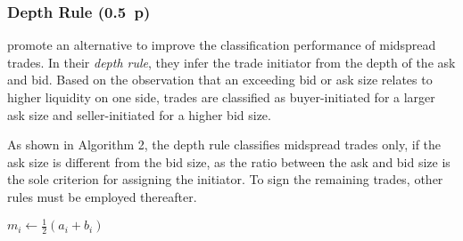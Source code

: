 
\subsubsection{Depth Rule (0.5~p)}\label{depth-rule}

\textcite{grauerOptionTradeClassification2022} promote an alternative to improve the classification performance of midspread trades. In their \textit{depth rule}, they infer the trade initiator from the depth of the ask and bid. Based on the observation that an exceeding bid or ask size relates to higher liquidity on one side, trades are classified as buyer-initiated for a larger ask size and seller-initiated for a higher bid size.

As shown in Algorithm 2, the depth rule classifies midspread trades only, if the ask size is different from the bid size, as the ratio between the ask and bid size is the sole criterion for assigning the initiator. To sign the remaining trades, other rules must be employed thereafter.

\begin{algorithm}


  \caption{$\operatorname{\mathtt{depth}}$ \label{alg:depth-rule}}


  \BlankLine %

  $m_i \leftarrow \frac{1}{2}(a_i + b_i)$ 

\end{algorithm}

